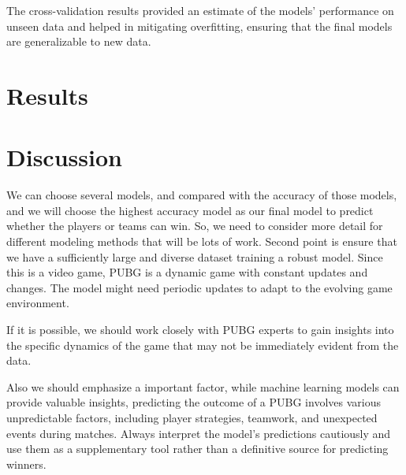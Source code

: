 \documentclass[12pt]{article}
\begin{document}
The cross-validation results provided an estimate of the models' performance on unseen data and helped in mitigating overfitting, ensuring that the final models are generalizable to new data.







\section{Results}
\label{sec:resu}







\section{Discussion}
\label{sec:disc}

We can choose several models, and compared with the accuracy of those models, and we will choose the highest accuracy model as our final model to predict whether the players or teams can win. So, we need to consider more detail for different modeling methods that will be lots of work.
Second point is ensure that we have a sufficiently large and diverse dataset training a robust model.
Since this is a video game, PUBG is a dynamic game with constant updates and changes. The model might need periodic updates to adapt to the evolving game environment.

If it is possible, we should work closely with PUBG experts to gain insights into the specific dynamics of the game that may not be immediately evident from the data.

Also we should emphasize a important factor, while machine learning models can provide valuable insights, predicting the outcome of a PUBG  involves various unpredictable factors, including player strategies, teamwork, and unexpected events during matches. Always interpret the model's predictions cautiously and use them as a supplementary tool rather than a definitive source for predicting winners.
\end{document}
